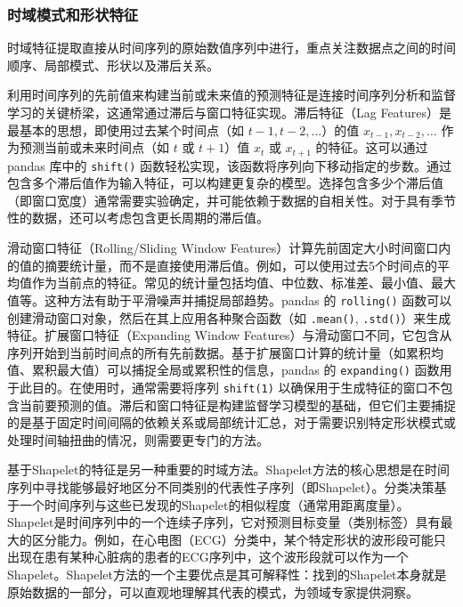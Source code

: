         \subsubsection{时域模式和形状特征}
            \label{sec:ts_subsequence_pattern}
            时域特征提取直接从时间序列的原始数值序列中进行，重点关注数据点之间的时间顺序、局部模式、形状以及滞后关系。

            利用时间序列的先前值来构建当前或未来值的预测特征是连接时间序列分析和监督学习的关键桥梁，这通常通过滞后与窗口特征实现。滞后特征（Lag Features）是最基本的思想，即使用过去某个时间点（如 $t-1, t-2, \dots$）的值 $x_{t-1}, x_{t-2}, \dots$ 作为预测当前或未来时间点（如 $t$ 或 $t+1$）值 $x_t$ 或 $x_{t+1}$ 的特征。这可以通过 pandas 库中的 \texttt{shift()} 函数轻松实现，该函数将序列向下移动指定的步数。通过包含多个滞后值作为输入特征，可以构建更复杂的模型。选择包含多少个滞后值（即窗口宽度）通常需要实验确定，并可能依赖于数据的自相关性。对于具有季节性的数据，还可以考虑包含更长周期的滞后值。
            
            滑动窗口特征（Rolling/Sliding Window Features）计算先前固定大小时间窗口内的值的摘要统计量，而不是直接使用滞后值。例如，可以使用过去5个时间点的平均值作为当前点的特征。常见的统计量包括均值、中位数、标准差、最小值、最大值等。这种方法有助于平滑噪声并捕捉局部趋势。pandas 的 \texttt{rolling()} 函数可以创建滑动窗口对象，然后在其上应用各种聚合函数（如 \texttt{.mean()}, \texttt{.std()}）来生成特征。扩展窗口特征（Expanding Window Features）与滑动窗口不同，它包含从序列开始到当前时间点的所有先前数据。基于扩展窗口计算的统计量（如累积均值、累积最大值）可以捕捉全局或累积性的信息，pandas 的 \texttt{expanding()} 函数用于此目的。在使用时，通常需要将序列 \texttt{shift(1)} 以确保用于生成特征的窗口不包含当前要预测的值。滞后和窗口特征是构建监督学习模型的基础，但它们主要捕捉的是基于固定时间间隔的依赖关系或局部统计汇总，对于需要识别特定形状模式或处理时间轴扭曲的情况，则需要更专门的方法。
            
            基于Shapelet的特征是另一种重要的时域方法。Shapelet方法的核心思想是在时间序列中寻找能够最好地区分不同类别的代表性子序列（即Shapelet）。分类决策基于一个时间序列与这些已发现的Shapelet的相似程度（通常用距离度量）。Shapelet是时间序列中的一个连续子序列，它对预测目标变量（类别标签）具有最大的区分能力。例如，在心电图（ECG）分类中，某个特定形状的波形段可能只出现在患有某种心脏病的患者的ECG序列中，这个波形段就可以作为一个Shapelet。Shapelet方法的一个主要优点是其可解释性：找到的Shapelet本身就是原始数据的一部分，可以直观地理解其代表的模式，为领域专家提供洞察。
            
